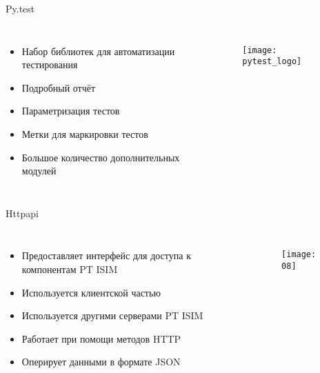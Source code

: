 \begin{frame}{Py.test}
    \begin{columns}
            \begin{itemize}
                \item Набор библиотек для автоматизации тестирования
                \item Подробный отчёт
                \item Параметризация тестов
                \item Метки для маркировки тестов
                \item Большое количество дополнительных модулей
            \end{itemize}
            \begin{figure}[h!]
                \centering
                \texttt{[image: pytest\_logo]}
                \label{img:pytest_logo}
            \end{figure}
    \end{columns}
\end{frame}

\begin{frame}{Httpapi}
    \begin{columns}
            \begin{itemize}
                \item Предоставляет интерфейс для доступа к компонентам PT ISIM
                \item Используется клиентской частью
                \item Используется другими серверами PT ISIM
                \item Работает при помощи методов HTTP
                \item Оперирует данными в формате JSON
            \end{itemize}
            \begin{figure}[h!]
                \centering
                \texttt{[image: 08]}
                \label{img:web_ui}
            \end{figure}
    \end{columns}
\end{frame}

